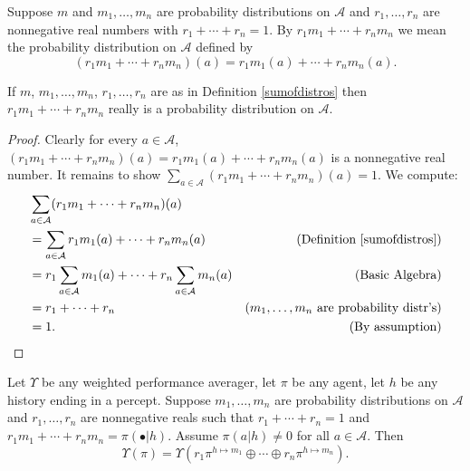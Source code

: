 \documentclass[runningheads]{llncs}
\begin{document}
\begin{definition}
\label{sumofdistros}
    Suppose $m$ and $m_1,\ldots,m_n$ are probability distributions on $\mathcal A$
    and $r_1,\ldots,r_n$ are nonnegative real numbers with
    $r_1+\cdots+r_n=1$. By $r_1m_1+\cdots+r_nm_n$ we mean the probability distribution
    on $\mathcal A$ defined by
    \[
        (r_1m_1+\cdots+r_nm_n)(a) = r_1m_1(a) + \cdots + r_nm_n(a).
    \]
\end{definition}

\begin{lemma}
    If $m$, $m_1,\ldots,m_n$, $r_1,\ldots,r_n$ are as in Definition \ref{sumofdistros}
    then $r_1m_1+\cdots+r_nm_n$ really is a probability distribution on $\mathcal A$.
\end{lemma}

\begin{proof}
    Clearly for every $a\in\mathcal A$,
    $(r_1m_1+\cdots+r_nm_n)(a) = r_1m_1(a) + \cdots + r_nm_n(a)$ is a nonnegative
    real number. It remains to show $\sum_{a\in\mathcal A}(r_1m_1+\cdots+r_nm_n)(a)=1$.
    We compute:
    \begin{align*}
        &{} \sum_{a\in\mathcal A}(r_1m_1+\cdots+r_nm_n)(a)\\
        &=
        \sum_{a\in\mathcal A} r_1m_1(a) + \cdots + r_nm_n(a)
            &\mbox{(Definition \ref{sumofdistros})}\\
        &=
        r_1\sum_{a\in\mathcal A} m_1(a) + \cdots + r_n\sum_{a\in\mathcal A}m_n(a)
            &\mbox{(Basic Algebra)}\\
        &= r_1 + \cdots + r_n
            &\mbox{($m_1,\ldots,m_n$ are probability distr's)}\\
        &= 1.
            &\mbox{(By assumption)}
    \end{align*}
\end{proof}

\begin{proposition}
\label{longproposition}
    Let $\Upsilon$ be any weighted performance averager, let $\pi$ be any agent,
    let $h$ be any history ending in a percept.
    Suppose $m_1,\ldots,m_n$ are probability distributions on $\mathcal A$
    and $r_1,\ldots,r_n$ are nonnegative reals such that $r_1+\cdots+r_n=1$
    and $r_1m_1+\cdots+r_nm_n=\pi(\bullet|h)$.
    Assume $\pi(a|h)\not=0$ for all $a\in\mathcal A$.
    Then
    \[
        \Upsilon(\pi)
        =
        \Upsilon(r_1\pi^{h\mapsto m_1} \oplus \cdots \oplus r_n\pi^{h\mapsto m_n}).
    \]
\end{proposition}
\end{document}
